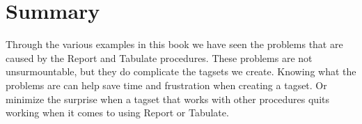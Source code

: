 \section{Summary}
Through the various examples in this book we have seen the problems
that are caused by the Report and Tabulate procedures.  These problems
are not unsurmountable, but they do complicate the tagsets we create.  
Knowing what the problems are can help save time and frustration when 
creating a tagset.  Or minimize the surprise when a tagset that works 
with other procedures quits working when it comes to using Report or 
Tabulate.


